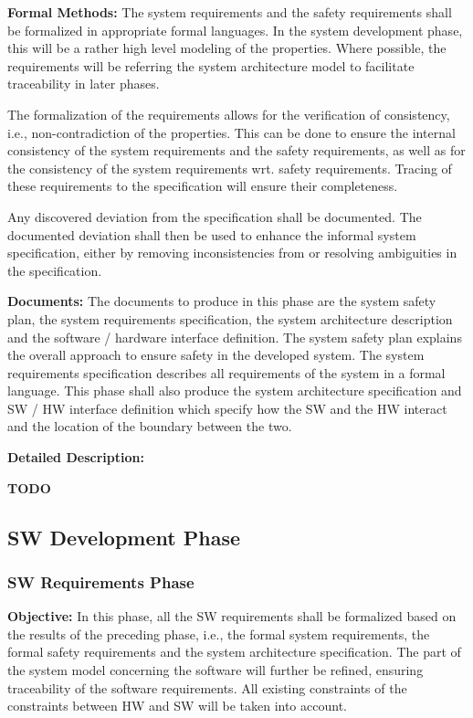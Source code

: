 {\bf Formal Methods:} The system requirements and the safety requirements shall
be formalized in appropriate formal languages. In the system development phase,
this will be a rather high level modeling of the properties. Where possible, the
requirements will be referring the system architecture model to facilitate
traceability in later phases.

The formalization of the requirements allows for the verification of
consistency, i.e., non-contradiction of the properties. This can be done to
ensure the internal consistency of the system requirements and the safety
requirements, as well as for the consistency of the system requirements
wrt. safety requirements. Tracing of these requirements to the specification
will ensure their completeness.

Any discovered deviation from the specification shall be documented. The
documented deviation shall then be used to enhance the informal system
specification, either by removing inconsistencies from or resolving ambiguities
in the specification.

{\bf Documents:} The documents to produce in this phase are the system safety
plan, the system requirements specification, the system architecture description
and the software / hardware interface definition. The system safety plan
explains the overall approach to ensure safety in the developed system. The
system requirements specification describes all requirements of the system in a
formal language. This phase shall also produce the system architecture
specification and SW / HW interface definition which specify how the SW and the
HW interact and the location of the boundary between the two.

{\bf Detailed Description:}

{\Huge \bf TODO}

\subsection{SW Development Phase}
\label{sec:sw-development-phase}

\subsubsection{SW Requirements Phase}
\label{sec:sw-requ-phase}

{\bf Objective:} In this phase, all the SW requirements shall be formalized
based on the results of the preceding phase, i.e., the formal system
requirements, the formal safety requirements and the system architecture
specification. The part of the system model concerning the software will further
be refined, ensuring traceability of the software requirements. All existing
constraints of the constraints between HW and SW will be taken into account.

